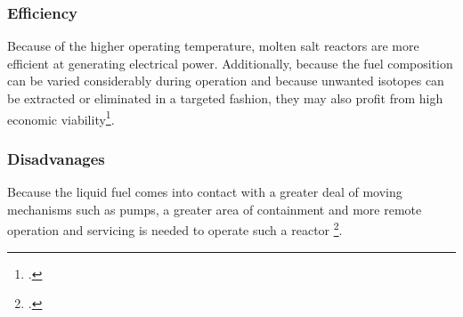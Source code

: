 \subsubsection{Efficiency}
Because of the higher operating temperature, molten salt reactors are more efficient at generating
electrical power. Additionally, because the fuel composition can be varied considerably during operation
and because unwanted isotopes can be extracted or eliminated in a targeted fashion, they may also
profit from high economic viability\footcite[159-161]{IVHandbook}.
\subsubsection{Disadvanages}
Because the liquid fuel comes into contact with a greater deal of moving mechanisms such as pumps, a
greater area of containment and more remote operation and servicing is needed to operate such a reactor
\footcite{msrs}.
